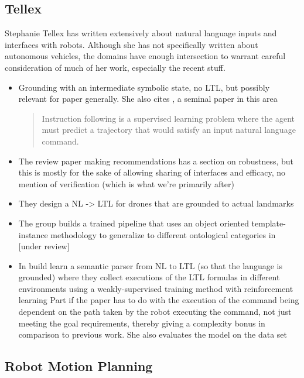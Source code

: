 \documentclass[a4paper, 11pt]{article}
\begin{document}
\subsection{Tellex}

Stephanie Tellex has written extensively about natural language inputs and
interfaces with robots. Although she has not specifically written about
autonomous vehicles, the domains have enough intersection to warrant careful
consideration of much of her work, especially the recent stuff.

\begin{itemize}

\item Grounding with an intermediate symbolic state, no LTL, but possibly
  relevant for paper generally. She also cites \cite{walkTalk}, a seminal paper in this area
\begin{quote}
Instruction following is a supervised learning problem
where the agent must predict a trajectory that would satisfy an
input natural language command. \cite{tellexInstr}
\end{quote}
\item The review paper \cite{MARGE2022101255} making recommendations has a
  section on robustness, but this is mostly for the sake of allowing sharing of
  interfaces and efficacy, no mention of verification (which is what we're
  primarily after)
\item They design a NL -> LTL for drones that are grounded to actual landmarks \cite{9197068}
\item The group builds a trained pipeline that uses an object oriented
  template-instance methodology to generalize to different ontological
  categories in  \cite{hsiung2021generalizing} [under review]

\item In \cite{patellearning} build learn a semantic parser from NL to LTL (so
that the language is grounded) where they collect executions of the LTL formulas
in different environments using a weakly-supervised training method with
reinforcement learning Part if the paper has to do with the execution of the
command being dependent on the path taken by the robot executing the command,
not just meeting the goal requirements, thereby giving a complexity bonus in
comparison to previous work. She also evaluates the model on the \cite{walkTalk}
data set
\end{itemize}

\subsection{Robot Motion Planning}
\end{document}
